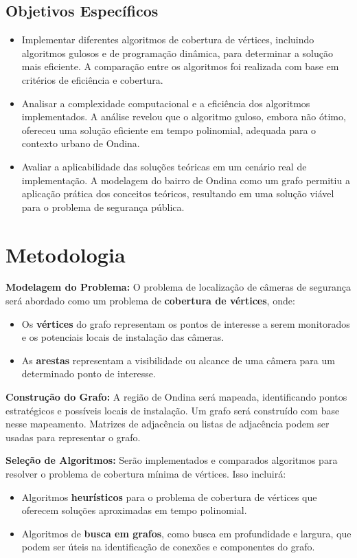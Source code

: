 \documentclass[12pt, a4paper]{report}
\begin{document}
\subsection{Objetivos Específicos}
\begin{itemize}
    \item Implementar diferentes algoritmos de cobertura de vértices, incluindo algoritmos gulosos e de programação dinâmica, para determinar a solução mais eficiente. A comparação entre os algoritmos foi realizada com base em critérios de eficiência e cobertura.
    \item Analisar a complexidade computacional e a eficiência dos algoritmos implementados. A análise revelou que o algoritmo guloso, embora não ótimo, ofereceu uma solução eficiente em tempo polinomial, adequada para o contexto urbano de Ondina.
    \item Avaliar a aplicabilidade das soluções teóricas em um cenário real de implementação. A modelagem do bairro de Ondina como um grafo permitiu a aplicação prática dos conceitos teóricos, resultando em uma solução viável para o problema de segurança pública.
\end{itemize}

\section{Metodologia}
\textbf{Modelagem do Problema:} O problema de localização de câmeras de segurança será abordado como um problema de \textbf{cobertura de vértices}, onde:
\begin{itemize}
    \item Os \textbf{vértices} do grafo representam os pontos de interesse a serem monitorados e os potenciais locais de instalação das câmeras.
    \item As \textbf{arestas} representam a visibilidade ou alcance de uma câmera para um determinado ponto de interesse.
\end{itemize}

\textbf{Construção do Grafo:} A região de Ondina será mapeada, identificando pontos estratégicos e possíveis locais de instalação. Um grafo será construído com base nesse mapeamento. Matrizes de adjacência ou listas de adjacência podem ser usadas para representar o grafo.

\textbf{Seleção de Algoritmos:} Serão implementados e comparados algoritmos para resolver o problema de cobertura mínima de vértices. Isso incluirá:
\begin{itemize}
    \item Algoritmos \textbf{heurísticos} para o problema de cobertura de vértices que oferecem soluções aproximadas em tempo polinomial.
    \item Algoritmos de \textbf{busca em grafos}, como busca em profundidade e largura, que podem ser úteis na identificação de conexões e componentes do grafo.
\end{itemize}
\end{document}
